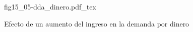 \begin{figure}[h]
\centering
\def\svgwidth{0.5\textwidth}
{fig15_05-dda_dinero.pdf_tex}
\caption{Efecto de un aumento del ingreso en la demanda por dinero}
\label{fig15_05-dda_dinero}
\end{figure}